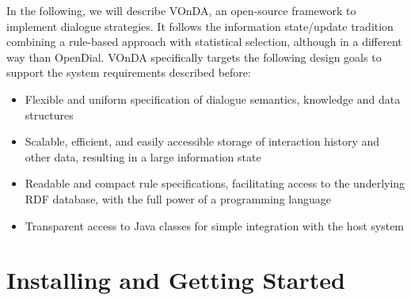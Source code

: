 \documentclass[a4paper]{report}
\newcommand{\vonda}{VOnDA\xspace}
\begin{document}
In the following, we will describe \vonda, an open-source framework to
implement dialogue strategies. It follows the information state/update
tradition \citep{traum2003information}
combining a rule-based approach with statistical selection, although in a
different way than OpenDial. \vonda specifically targets the following design
goals to support the system requirements described before:

\begin{itemize}
  \addtolength{\itemsep}{-.6\itemsep}
\item Flexible and uniform specification of dialogue semantics, knowledge and
  data structures
\item Scalable, efficient, and easily accessible storage of interaction history
  and other data, resulting in a large information state
\item Readable and compact rule specifications, facilitating access to the
  underlying RDF database, with the full power of a programming language
\item Transparent access to Java classes for simple integration with the host
  system
\end{itemize}
\fi



%

\chapter{Installing and Getting Started}









\end{document}
